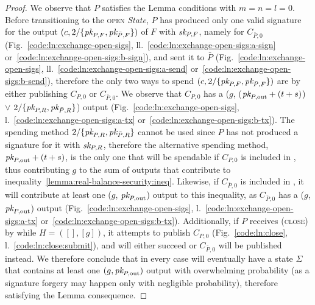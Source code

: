 \begin{proof}
  We observe that $P$ satisfies the Lemma conditions with $m = n = l = 0$.
  Before transitioning to the \textsc{open} \textit{State}, $P$ has produced
  only one valid signature for the output $(c, 2/\{\textit{pk}_{P, F}, \textit{pk}_{\bar{P},
  F}\})$ of $F$ with $\textit{sk}_{P, F}$, namely for $C_{\bar{P}, 0}$
  (Fig.~\ref{code:ln:exchange-open-sigs},
  ll.~\ref{code:ln:exchange-open-sigs:a-sign}
  or~\ref{code:ln:exchange-open-sigs:b-sign}), and sent it to $\bar{P}$
  (Fig.~\ref{code:ln:exchange-open-sigs},
  ll.~\ref{code:ln:exchange-open-sigs:a-send}
  or~\ref{code:ln:exchange-open-sigs:b-send}), therefore the only two ways to
  spend $(c, 2/\{\textit{pk}_{P, F}, \textit{pk}_{\bar{P}, F}\})$ are by either publishing $C_{P,
  0}$ or $C_{\bar{P}, 0}$. We observe that $C_{P, 0}$ has a ($g$, ($\textit{pk}_{P,
  \mathrm{out}} + (t + s)$) $\vee$ $2/\{\textit{pk}_{P, R}, \textit{pk}_{\bar{P}, R}\}$) output
  (Fig.~\ref{code:ln:exchange-open-sigs},
  l.~\ref{code:ln:exchange-open-sigs:a-tx}
  or~\ref{code:ln:exchange-open-sigs:b-tx}). The spending method $2/\{\textit{pk}_{P, R},
  \textit{pk}_{\bar{P}, R}\}$ cannot be used since $P$ has not produced a signature for
  it with $\textit{sk}_{P, R}$, therefore the alternative spending method, $\textit{pk}_{P,
  \mathrm{out}} + (t + s)$, is the only one that will be spendable if $C_{P, 0}$
  is included in \ledger, thus contributing $g$ to the sum of outputs that
  contribute to inequality~\ref{lemma:real-balance-security:ineq}. Likewise, if
  $C_{\bar{P}, 0}$ is included in \ledger, it will contribute at least one ($g$,
  $\textit{pk}_{P, \mathrm{out}}$) output to this inequality, as $C_{\bar{P}, 0}$ has a
  ($g$, $\textit{pk}_{P, \mathrm{out}}$) output (Fig.~\ref{code:ln:exchange-open-sigs},
  l.~\ref{code:ln:exchange-open-sigs:a-tx}
  or~\ref{code:ln:exchange-open-sigs:b-tx}). Additionally, if $P$ receives
  (\textsc{close}) by \environment while $H = ([], [g])$, it attempts to publish
  $C_{P, 0}$ (Fig.~\ref{code:ln:close}, l.~\ref{code:ln:close:submit}), and will
  either succeed or $C_{\bar{P}, 0}$ will be published instead. We therefore
  conclude that in every case \ledger will eventually have a state $\Sigma$ that
  contains at least one $(g, \textit{pk}_{P, \mathrm{out}})$ output with overwhelming
  probability (as a signature forgery may happen only with negligible
  probability), therefore satisfying the Lemma consequence.
\end{proof}

